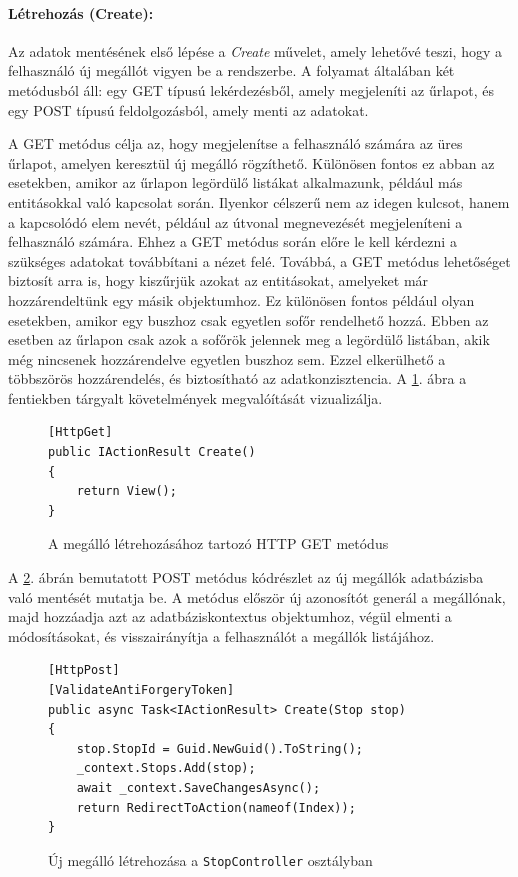 \paragraph{Létrehozás (Create):}
Az adatok mentésének első lépése a \textit{Create} művelet, amely lehetővé teszi, hogy a felhasználó új megállót vigyen be a rendszerbe. A folyamat általában két metódusból áll: egy GET típusú lekérdezésből, amely megjeleníti az űrlapot, és egy POST típusú feldolgozásból, amely menti az adatokat.

A GET metódus célja az, hogy megjelenítse a felhasználó számára az üres űrlapot, amelyen keresztül új megálló rögzíthető. Különösen fontos ez abban az esetekben, amikor az űrlapon legördülő listákat alkalmazunk, például más entitásokkal való kapcsolat során. Ilyenkor célszerű nem az idegen kulcsot, hanem a kapcsolódó elem nevét, például az útvonal megnevezését megjeleníteni a felhasználó számára. Ehhez a GET metódus során előre le kell kérdezni a szükséges adatokat továbbítani a nézet felé. Továbbá, a GET metódus lehetőséget biztosít arra is, hogy kiszűrjük azokat az entitásokat, amelyeket már hozzárendeltünk egy másik objektumhoz. Ez különösen fontos például olyan esetekben, amikor egy buszhoz csak egyetlen sofőr rendelhető hozzá. Ebben az esetben az űrlapon csak azok a sofőrök jelennek meg a legördülő listában, akik még nincsenek hozzárendelve egyetlen buszhoz sem. Ezzel elkerülhető a többszörös hozzárendelés, és biztosítható az adatkonzisztencia. A \ref{fig:get-create-stop}. ábra a fentiekben tárgyalt követelmények megvalóítását vizualizálja.

\begin{figure}[H]
\caption{A megálló létrehozásához tartozó HTTP GET metódus}
\label{fig:get-create-stop}
\begin{minipage}{\textwidth}
\begin{BVerbatim}
[HttpGet]
public IActionResult Create()
{
    return View();
}
\end{BVerbatim}
\end{minipage}
\end{figure}

A \ref{fig:create-stop}. ábrán bemutatott POST metódus kódrészlet az új megállók adatbázisba való mentését mutatja be. A metódus először új azonosítót generál a megállónak, majd hozzáadja azt az adatbáziskontextus objektumhoz, végül elmenti a módosításokat, és visszairányítja a felhasználót a megállók listájához.

\begin{figure}[H]
\caption{Új megálló létrehozása a \texttt{StopController} osztályban}
\label{fig:create-stop}
\begin{minipage}{\textwidth}
\begin{BVerbatim}
[HttpPost]
[ValidateAntiForgeryToken]
public async Task<IActionResult> Create(Stop stop)
{
    stop.StopId = Guid.NewGuid().ToString();
    _context.Stops.Add(stop);
    await _context.SaveChangesAsync();
    return RedirectToAction(nameof(Index));
}
\end{BVerbatim}
\end{minipage}
\end{figure}

